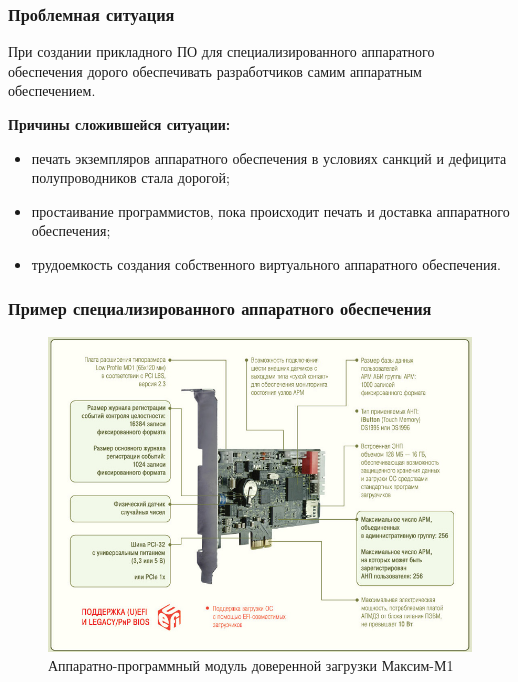 \begin{frame}%
    \frametitle{Проблемная ситуация}

    При создании прикладного ПО для специализированного аппаратного обеспечения
    дорого обеспечивать разработчиков самим аппаратным обеспечением.

    \textbf{Причины сложившейся ситуации:}
    \begin{itemize}
        \item печать экземпляров аппаратного обеспечения в условиях санкций и дефицита полупроводников стала дорогой;
        \item простаивание программистов, пока происходит печать и доставка аппаратного обеспечения;
        \item трудоемкость создания собственного виртуального аппаратного обеспечения.
    \end{itemize}
\end{frame}


\begin{frame}%
    \frametitle{Пример специализированного аппаратного обеспечения}
    \begin{figure}[!htbp]
        \centering
        \begin{adjustbox}{max totalsize={0.8\textwidth}{0.8\textheight}}
            \includegraphics[]{images/apmdz.png}
        \end{adjustbox}
        \caption{Аппаратно-программный модуль доверенной загрузки Максим-М1}
    \end{figure}
\end{frame}


